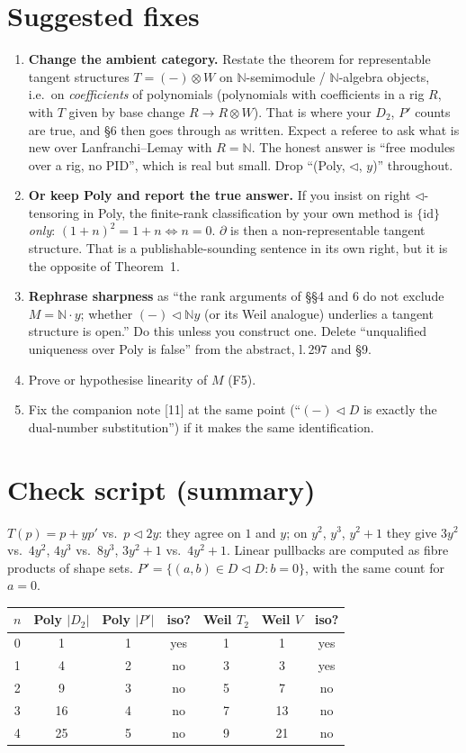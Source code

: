 \documentclass[11pt]{article}
\newcommand{\tri}{\mathbin{\triangleleft}}
\newcommand{\N}{\mathbb{N}}
\begin{document}
\section*{Suggested fixes}
\begin{enumerate}[leftmargin=*]
\item \textbf{Change the ambient category.} Restate the theorem for representable tangent
structures $T=(-)\otimes W$ on $\N$-semimodule / $\N$-algebra objects, i.e.\ on
\emph{coefficients} of polynomials (polynomials with coefficients in a rig $R$, with $T$ given by
base change $R\to R\otimes W$). That is where your $D_2$, $P'$ counts are true, and \S6 then goes
through as written. Expect a referee to ask what is new over Lanfranchi--Lemay with $R=\N$. The
honest answer is ``free modules over a rig, no PID'', which is real but small. Drop ``(Poly,
$\tri$, $y$)'' throughout.
\item \textbf{Or keep Poly and report the true answer.} If you insist on right
$\tri$-tensoring in Poly, the finite-rank classification by your own method is
\emph{$\{\mathrm{id}\}$ only}: $(1+n)^2=1+n\iff n=0$. $\partial$ is then a non-representable
tangent structure. That is a publishable-sounding sentence in its own right, but it is the
opposite of Theorem~1.
\item \textbf{Rephrase sharpness} as ``the rank arguments of \S\S4 and 6 do not exclude
$M=\N\cdot y$; whether $(-)\tri\N y$ (or its Weil analogue) underlies a tangent structure is
open.'' Do this unless you construct one. Delete ``unqualified uniqueness over Poly is false'' from
the abstract, l.\,297 and \S9.
\item Prove or hypothesise linearity of $M$ (F5).
\item Fix the companion note [11] at the same point (``$(-)\tri D$ is exactly the dual-number
substitution'') if it makes the same identification.
\end{enumerate}

\appendix
\section{Check script (summary)}
\small
$T(p)=p+yp'$ vs.\ $p\tri 2y$: they agree on $1$ and $y$; on $y^2$, $y^3$, $y^2+1$ they give
$3y^2$ vs.\ $4y^2$, $4y^3$ vs.\ $8y^3$, $3y^2+1$ vs.\ $4y^2+1$.
Linear pullbacks are computed as fibre products of shape sets. $P'=\{(a,b)\in D\tri D: b=0\}$,
with the same count for $a=0$.
\begin{center}\begin{tabular}{c|ccc|ccc}
$n$ & Poly $|D_2|$ & Poly $|P'|$ & iso? & Weil $T_2$ & Weil $V$ & iso?\\\hline
0&1&1&yes&1&1&yes\\
1&4&2&no&3&3&yes\\
2&9&3&no&5&7&no\\
3&16&4&no&7&13&no\\
4&25&5&no&9&21&no
\end{tabular}\end{center}
\end{document}
